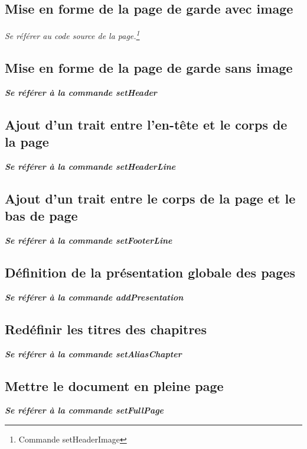 \documentclass[12pt]{report}
\newcommand{\italic}[1]{\textit{#1}}
\newcommand{\bi}[1]{\textit{\textbf{#1}}}
\begin{document}
\subsection{Mise en forme de la page de garde avec image}

\italic{Se référer au code source de la page.\footnote{Commande setHeaderImage}}

\subsection{Mise en forme de la page de garde sans image}

\bi{Se référer à la commande setHeader}

\subsection{Ajout d'un trait entre l'en-tête et le corps de la page}

\bi{Se référer à la commande setHeaderLine}

\subsection{Ajout d'un trait entre le corps de la page et le bas de page}

\bi{Se référer à la commande setFooterLine}

\subsection{Définition de la présentation globale des pages}

\bi{Se référer à la commande addPresentation}


\subsection{Redéfinir les titres des chapitres}

\bi{Se référer à la commande setAliasChapter}

\subsection{Mettre le document en pleine page}

\bi{Se référer à la commande setFullPage}
\end{document}
